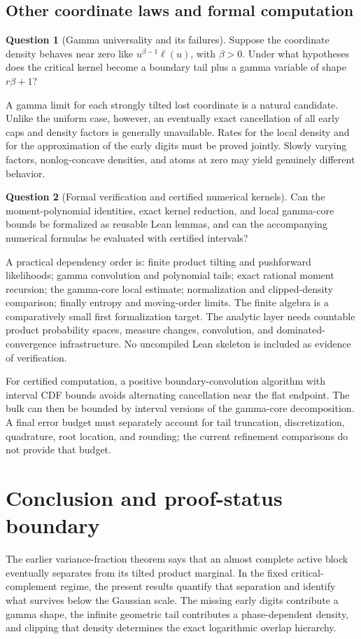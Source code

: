 \documentclass[11pt,oneside]{article}
\numberwithin{equation}{section}
\theoremstyle{plain}
\theoremstyle{definition}
\newtheorem{question}{Question}
\theoremstyle{remark}
\begin{document}
\subsection{Other coordinate laws and formal computation}
\begin{question}[Gamma universality and its failures]
Suppose the coordinate density behaves near zero like
$u^{\beta-1}\ell(u)$, with $\beta>0$. Under what hypotheses does the
critical kernel become a boundary tail plus a gamma variable of
shape $r\beta+1$?
\end{question}
A gamma limit for each strongly tilted lost coordinate is a natural
candidate. Unlike the uniform case, however, an eventually exact
cancellation of all early caps and density factors is generally
unavailable. Rates for the local density and for the approximation
of the early digits must be proved jointly. Slowly varying factors,
nonlog-concave densities, and atoms at zero may yield genuinely
different behavior.

\begin{question}[Formal verification and certified numerical kernels]
Can the moment-polynomial identities, exact kernel reduction, and
local gamma-core bounds be formalized as reusable Lean lemmas,
and can the accompanying numerical formulas be evaluated with
certified intervals?
\end{question}
A practical dependency order is: finite product tilting and pushforward
likelihoods; gamma convolution and polynomial tails; exact rational
moment recursion; the gamma-core local estimate; normalization and
clipped-density comparison; finally entropy and moving-order limits.
The finite algebra is a comparatively small first formalization target.
The analytic layer needs countable product probability spaces,
measure changes, convolution, and dominated-convergence infrastructure.
No uncompiled Lean skeleton is included as evidence of verification.

For certified computation, a positive boundary-convolution algorithm
with interval CDF bounds avoids alternating cancellation near the flat
endpoint. The bulk can then be bounded by interval versions of the
gamma-core decomposition. A final error budget must separately account
for tail truncation, discretization, quadrature, root location, and
rounding; the current refinement comparisons do not provide that budget.

\section{Conclusion and proof-status boundary}
The earlier variance-fraction theorem says that an almost complete
active block eventually separates from its tilted product marginal.
In the fixed critical-complement regime, the present results quantify
that separation and identify what survives below the Gaussian scale.
The missing early digits contribute a gamma shape, the infinite
geometric tail contributes a phase-dependent density, and clipping
that density determines the exact logarithmic overlap hierarchy.
\end{document}
